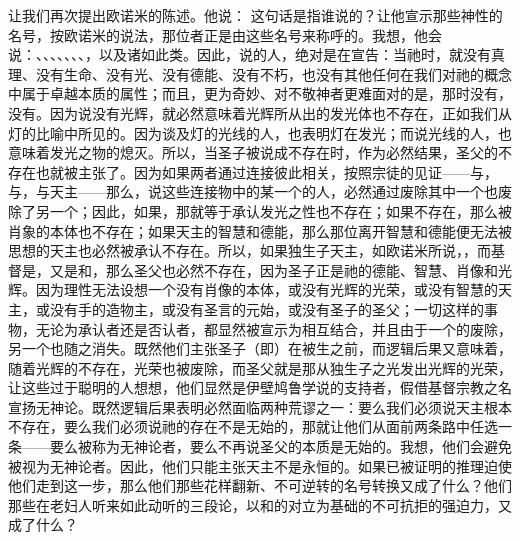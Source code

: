 让我们再次提出欧诺米的陈述。他说： 这句话是指谁说的？让他宣示那些神性的名号，按欧诺米的说法，那位者正是由这些名号来称呼的。我想，他会说：、、、、、、、，以及诸如此类。因此，说的人，绝对是在宣告：当祂时，就没有真理、没有生命、没有光、没有德能、没有不朽，也没有其他任何在我们对祂的概念中属于卓越本质的属性；而且，更为奇妙、对不敬神者更难面对的是，那时没有，没有。因为说没有光辉，就必然意味着光辉所从出的发光体也不存在，正如我们从灯的比喻中所见的。因为谈及灯的光线的人，也表明灯在发光；而说光线的人，也意味着发光之物的熄灭。所以，当圣子被说成不存在时，作为必然结果，圣父的不存在也就被主张了。因为如果两者通过连接彼此相关，按照宗徒的见证——与，与，与天主——那么，说这些连接物中的某一个的人，必然通过废除其中一个也废除了另一个；因此，如果，那就等于承认发光之性也不存在；如果不存在，那么被肖象的本体也不存在；如果天主的智慧和德能，那么那位离开智慧和德能便无法被思想的天主也必然被承认不存在。所以，如果独生子天主，如欧诺米所说，，而基督是，又是和，那么圣父也必然不存在，因为圣子正是祂的德能、智慧、肖像和光辉。因为理性无法设想一个没有肖像的本体，或没有光辉的光荣，或没有智慧的天主，或没有手的造物主，或没有圣言的元始，或没有圣子的圣父；一切这样的事物，无论为承认者还是否认者，都显然被宣示为相互结合，并且由于一个的废除，另一个也随之消失。既然他们主张圣子（即）在被生之前，而逻辑后果又意味着，随着光辉的不存在，光荣也被废除，而圣父就是那从独生子之光发出光辉的光荣，让这些过于聪明的人想想，他们显然是伊壁鸠鲁学说的支持者，假借基督宗教之名宣扬无神论。既然逻辑后果表明必然面临两种荒谬之一：要么我们必须说天主根本不存在，要么我们必须说祂的存在不是无始的，那就让他们从面前两条路中任选一条——要么被称为无神论者，要么不再说圣父的本质是无始的。我想，他们会避免被视为无神论者。因此，他们只能主张天主不是永恒的。如果已被证明的推理迫使他们走到这一步，那么他们那些花样翻新、不可逆转的名号转换又成了什么？他们那些在老妇人听来如此动听的三段论，以和的对立为基础的不可抗拒的强迫力，又成了什么？\par

